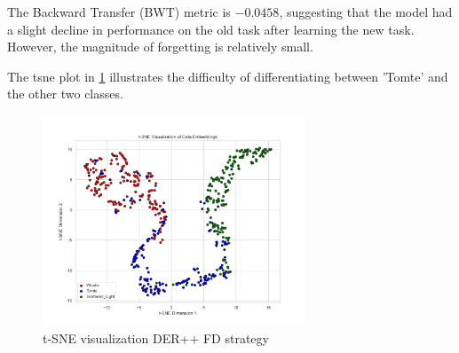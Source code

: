 The Backward Transfer (BWT) metric is $-0.0458$, suggesting that the model had a slight decline in performance on the old task after learning the new task. However, the magnitude of forgetting is relatively small. 

The \acrshort{tsne} plot in \ref{fig:tsne_FD_DER++} illustrates the difficulty of differentiating between 'Tomte' and the other two classes. 

\begin{figure}[ht]
    \centering
    \includegraphics[width=0.7\textwidth]{Grad Assignment/Images/tSNE_FractalDimension_DER++_test.png}
    \caption{t-SNE visualization DER++ FD strategy}
    \label{fig:tsne_FD_DER++}
\end{figure}


